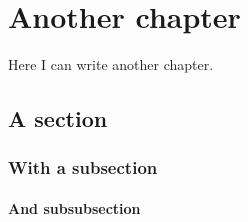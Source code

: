 %
%
%



\chapter{Another chapter}
Here I can write another chapter.

\section{A section}

\subsection{With a subsection}

\subsubsection{And subsubsection}